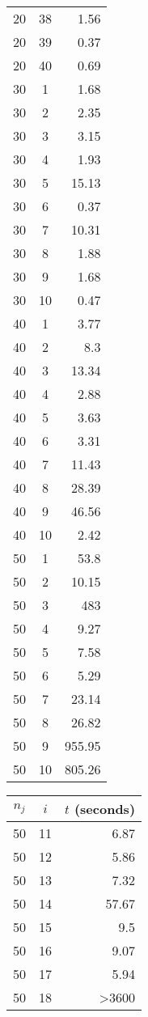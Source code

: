 \documentclass[13pt, letterpaper, oneside]{book}
\begin{document}
\begin{multicols}{5}
\begin{tabular}{c c r}
20 & 38 & 1.56 \\
20 & 39 & 0.37 \\
20 & 40 & 0.69 \\
30 & 1 & 1.68 \\
30 & 2 & 2.35 \\
30 & 3 & 3.15 \\
30 & 4 & 1.93 \\
30 & 5 & 15.13 \\
30 & 6 & 0.37 \\
30 & 7 & 10.31 \\
30 & 8 & 1.88 \\
30 & 9 & 1.68 \\
30 & 10 & 0.47 \\
40 & 1 & 3.77 \\
40 & 2 & 8.3 \\
40 & 3 & 13.34 \\
40 & 4 & 2.88 \\
40 & 5 & 3.63 \\
40 & 6 & 3.31 \\
40 & 7 & 11.43 \\
40 & 8 & 28.39 \\
40 & 9 & 46.56 \\
40 & 10 & 2.42 \\
50 & 1 & 53.8 \\
50 & 2 & 10.15 \\
50 & 3 & 483 \\
50 & 4 & 9.27 \\
50 & 5 & 7.58 \\
50 & 6 & 5.29 \\
50 & 7 & 23.14 \\
50 & 8 & 26.82 \\
50 & 9 & 955.95 \\
50 & 10 & 805.26 \\
\bottomrule
\end{tabular}
\vfill
\columnbreak
\begin{tabular}{c c r}
\toprule
$n_j$ & $i$ & $t$ (seconds) \\
\midrule 
50 & 11 & 6.87 \\
50 & 12 & 5.86 \\
50 & 13 & 7.32 \\
50 & 14 & 57.67 \\
50 & 15 & 9.5 \\
50 & 16 & 9.07 \\
50 & 17 & 5.94 \\
50 & 18 & >3600 \\

\end{tabular}
\end{multicols}
\end{document}
